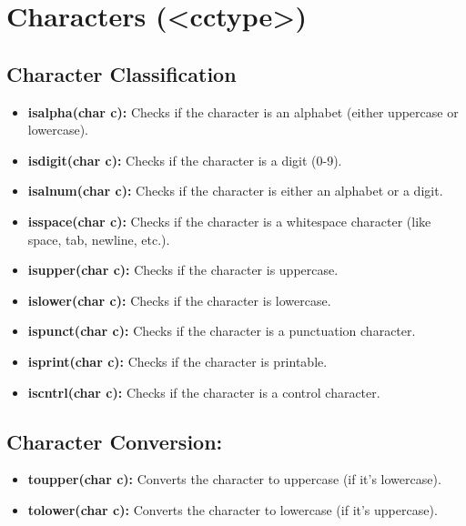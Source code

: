 \documentclass{report}
\begin{document}
    \pagebreak \bigbreak \noindent 
    \section{\LARGE Characters (<cctype>)}
    \bigbreak \noindent 
    \subsection{Character Classification}
    \begin{itemize}
        \item \textbf{isalpha(char c):} Checks if the character is an alphabet (either uppercase or lowercase).
        \item \textbf{isdigit(char c):} Checks if the character is a digit (0-9).
        \item \textbf{isalnum(char c):} Checks if the character is either an alphabet or a digit.
        \item \textbf{isspace(char c):} Checks if the character is a whitespace character (like space, tab, newline, etc.).
        \item \textbf{isupper(char c):} Checks if the character is uppercase.
        \item \textbf{islower(char c):} Checks if the character is lowercase.
        \item \textbf{ispunct(char c):} Checks if the character is a punctuation character.
        \item \textbf{isprint(char c):} Checks if the character is printable.
        \item \textbf{iscntrl(char c):} Checks if the character is a control character.
    \end{itemize}
    \bigbreak \noindent 
    \subsection{Character Conversion:}
    \begin{itemize}
        \item \textbf{toupper(char c):} Converts the character to uppercase (if it's lowercase).
        \item \textbf{tolower(char c):} Converts the character to lowercase (if it's uppercase).
    \end{itemize}

\end{document}
